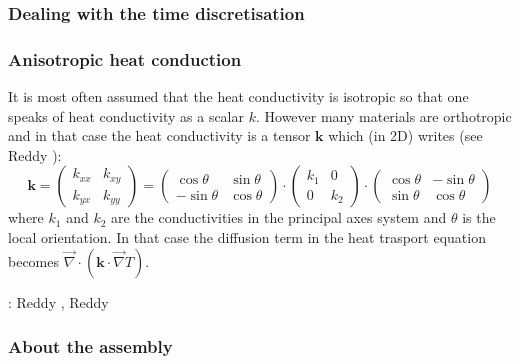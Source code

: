 \subsubsection{Dealing with the time discretisation} \label{sec:timediscr}


\subsubsection{Anisotropic heat conduction}\label{sec:anisotropic}


It is most often assumed that the heat conductivity is isotropic so that one speaks of heat conductivity as a 
scalar $k$.  However many materials are orthotropic and in that case the heat conductivity is a 
tensor ${\bm k}$ which (in 2D) writes (see Reddy \cite[p121]{reddybook2}):
\[
{\bm k}
=
\left(
\begin{array}{cc}
k_{xx} & k_{xy} \\
k_{yx} & k_{yy}
\end{array}
\right)
=
\left(
\begin{array}{cc}
\cos\theta & \sin\theta \\
-\sin\theta & \cos\theta
\end{array}
\right)
\cdot
\left(
\begin{array}{cc}
k_1 & 0 \\ 0 & k_2
\end{array}
\right)
\cdot
\left(
\begin{array}{cc}
\cos\theta & -\sin\theta \\
\sin\theta & \cos\theta
\end{array}
\right)
\]
where $k_1$ and $k_2$ are the conductivities in the principal axes system and $\theta$ is 
the local orientation.
In that case the diffusion term in the heat trasport equation becomes $\vec{\nabla}\cdot({\bm k}\cdot \vec{\nabla}T)$.


\mscthesis: Reddy \cite[p121]{reddybook2}, Reddy \cite[p143]{reddybook2} 



\subsubsection{About the assembly}

